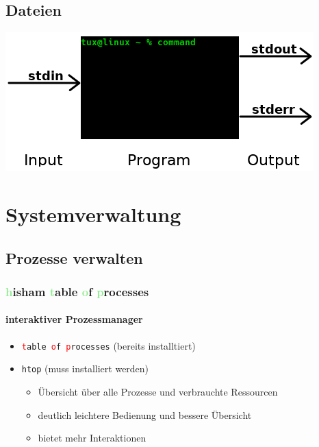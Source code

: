 \documentclass[12pt,utf8]{beamer}
\begin{document}
\subsection{Dateien}
\begin{frame}
	\centering\includegraphics[scale=0.65]{res/IOE}
\end{frame}

\begin{frame}
	\Huge\centering{$|$~~~$>$}
\end{frame}

\begin{frame}
\Huge\centering{\&}
\end{frame}

\section{Systemverwaltung}
\subsection{Prozesse verwalten}
\begin{frame}
\frametitle{\textcolor{lightGreen}{h}isham \textcolor{lightGreen}{t}able \textcolor{lightGreen}{o}f \textcolor{lightGreen}{p}rocesses}
\framesubtitle{interaktiver Prozessmanager}
\begin{itemize}
	\item \texttt{\textcolor{red}{t}able \textcolor{red}{o}f \textcolor{red}{p}rocesses} (bereits installtiert)
	\item \texttt{htop} (muss installiert werden)
	\begin{itemize}[<+->]
		\item {\scriptsize Übersicht über alle Prozesse und verbrauchte Ressourcen}
		\item {\scriptsize deutlich leichtere Bedienung und bessere Übersicht}
		\item {\scriptsize bietet mehr Interaktionen}
	\end{itemize}
\end{itemize}
\end{frame}
\end{document}
